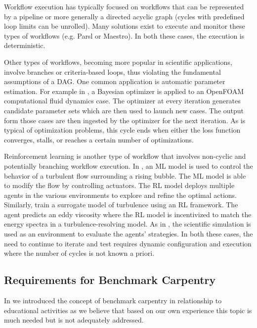 \documentclass[utf8]{FrontiersinVancouver} %
\begin{document}
Workflow execution has typically focused on workflows that can be represented by a pipeline or more generally a directed acyclic graph (cycles with predefined loop limits can be unrolled). Many solutions exist to execute and monitor these types of workflows (e.g. Parsl or Maestro). In both these cases, the execution is deterministic.

Other types of workflows, becoming more popular in scientific applications, involve branches or criteria-based loops, thus violating the fundamental assumptions of a DAG. One common application is automatic parameter estimation.  For example in \citep{Maric2024OpenFOAM}, a Bayesian optimizer is applied to an OpenFOAM computational fluid dynamics case. The optimizer at every iteration generates candidate parameter sets which are then used to launch new cases. The output form those cases are then ingested by the optimizer for the next iteration. As is typical of optimization problems, this cycle ends when either the loss function converges, stalls, or reaches a certain number of optimizations.

Reinforcement learning is another type of workflow that involves non-cyclic and potentially branching workflow execution. In \citep{Font2024}, an ML model is used to control the behavior of a turbulent flow surrounding a rising bubble. The ML model is able to modify the flow by controlling actuators.  The RL model deploys multiple agents in the various environments to explore and refine the optimal actions. Similarly, \citep{Kurz2022} train a surrogate model of turbulence using an RL framework. The agent predicts an eddy viscosity where the RL model is incentivized to match the energy spectra in a turbulence-resolving model. As in \citep{Font24}, the scientific simulation is used as an environment to evaluate the agents' strategies. In both these cases, the need to continue to iterate and test requires dynamic configuration and execution where the number of cycles is not known a priori.



\subsection{Requirements for Benchmark Carpentry}

In \citep{las-frontiers-edu} we introduced the concept of benchmark carpentry in relationship to educational activities as we believe that based on our own experience this topic is much needed but is not adequately addressed. 
\end{document}
